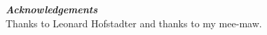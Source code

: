\cleardoublepage


\begin{verbatim}




 





\end{verbatim}

\textbf{\emph{Acknowledgements}}
\bigskip
\\
Thanks to Leonard Hofstadter and thanks to my mee-maw.

